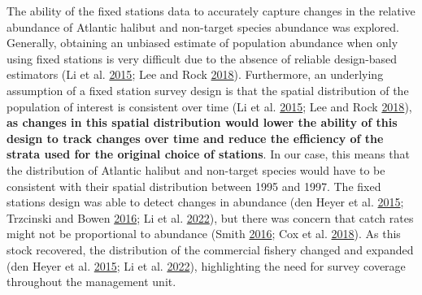 \documentclass[12pt]{article}\usepackage[]{graphicx}\usepackage[]{color}
\begin{document}
The ability of the fixed stations data to accurately capture changes in the relative abundance of Atlantic halibut and non-target species abundance was explored. Generally, obtaining an unbiased estimate of population abundance when only using fixed stations is very difficult due to the absence of reliable design-based estimators (Li et al. \protect\hyperlink{ref-Li2015}{2015}; Lee and Rock \protect\hyperlink{ref-Lee2018}{2018}). Furthermore, an underlying assumption of a fixed station survey design is that the spatial distribution of the population of interest is consistent over time (Li et al. \protect\hyperlink{ref-Li2015}{2015}; Lee and Rock \protect\hyperlink{ref-Lee2018}{2018}), \textbf{as changes in this spatial distribution would lower the ability of this design to track changes over time and reduce the efficiency of the strata used for the original choice of stations}. In our case, this means that the distribution of Atlantic halibut and non-target species would have to be consistent with their spatial distribution between 1995 and 1997. The fixed stations design was able to detect changes in abundance (den Heyer et al. \protect\hyperlink{ref-DenHeyer2015}{2015}; Trzcinski and Bowen \protect\hyperlink{ref-Trzcinski2016}{2016}; Li et al. \protect\hyperlink{ref-Li2022}{2022}), but there was concern that catch rates might not be proportional to abundance (Smith \protect\hyperlink{ref-Smith2016a}{2016}; Cox et al. \protect\hyperlink{ref-Cox2018}{2018}). As this stock recovered, the distribution of the commercial fishery changed and expanded (den Heyer et al. \protect\hyperlink{ref-DenHeyer2015}{2015}; Li et al. \protect\hyperlink{ref-Li2022}{2022}), highlighting the need for survey coverage throughout the management unit.
\end{document}
